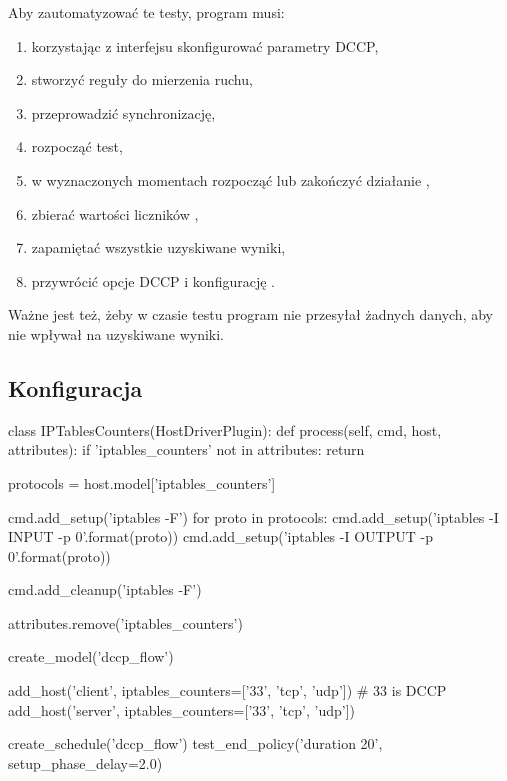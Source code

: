 \documentclass[00-praca-magisterska.tex]{subfiles}
\begin{document}
Aby zautomatyzować te testy, program musi:
\begin{enumerate}
\item korzystając z interfejsu  skonfigurować parametry DCCP,
\item stworzyć reguły  do mierzenia ruchu,
\item przeprowadzić synchronizację, 
\item rozpocząć test,
\item w wyznaczonych momentach rozpocząć lub zakończyć działanie ,
\item zbierać wartości liczników ,
\item zapamiętać wszystkie uzyskiwane wyniki,
\item przywrócić opcje DCCP i konfigurację .
\end{enumerate}

Ważne jest też, żeby w czasie testu program nie przesyłał żadnych danych, aby
nie wpływał na uzyskiwane wyniki.

\subsection{Konfiguracja}


\begin{pythoncode}
  class IPTablesCounters(HostDriverPlugin):
      def process(self, cmd, host, attributes):
          if 'iptables_counters' not in attributes:
              return 

          protocols = host.model['iptables_counters']

          cmd.add_setup('iptables -F')
          for proto in protocols:
              cmd.add_setup('iptables -I INPUT -p {0}'.format(proto))
              cmd.add_setup('iptables -I OUTPUT -p {0}'.format(proto))

          cmd.add_cleanup('iptables -F')

          attributes.remove('iptables_counters')
\end{pythoncode}

\begin{pythoncode}
  create_model('dccp_flow')

  add_host('client', iptables_counters=['33', 'tcp', 'udp']) # 33 is DCCP
  add_host('server', iptables_counters=['33', 'tcp', 'udp'])
\end{pythoncode}

\begin{pythoncode}
  create_schedule('dccp_flow')
  test_end_policy('duration 20', setup_phase_delay=2.0)
\end{pythoncode}
\end{document}
